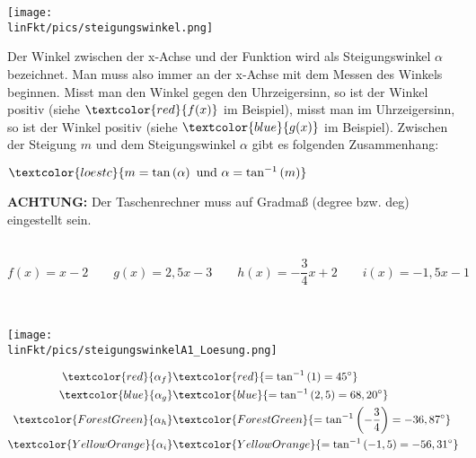 \begin{minipage}[t]{\textwidth}
	\centering
	\texttt{[image: \\linFkt/pics/steigungswinkel.png]}
\end{minipage}
Der Winkel zwischen der x-Achse und der Funktion wird als Steigungswinkel $\alpha$ bezeichnet. Man muss also immer an der x-Achse mit dem Messen des Winkels beginnen. Misst man den Winkel gegen den Uhrzeigersinn, so ist der Winkel positiv (siehe $\textcolor{red}{f(x)}$ im Beispiel), misst man im Uhrzeigersinn, so ist der Winkel positiv (siehe $\textcolor{blue}{g(x)}$ im Beispiel). Zwischen der Steigung $m$ und dem Steigungswinkel $\alpha$ gibt es folgenden Zusammenhang:\\
\begin{tcolorbox}
	\centering
	$\textcolor{loestc}{m=\tan\left(\alpha\right)\text{ und }\alpha=\tan^{-1}\left(m\right)}$
\end{tcolorbox}
\textbf{ACHTUNG:} Der Taschenrechner muss auf Gradmaß (degree bzw. deg) eingestellt sein.
\begin{Exercise}[title={Zeichne das Schaubild, miss den Steigungswinkel und vergleiche den Wert mit dem rechnerisch exakten.}, label=steigungswinkelA1]\\
	$f(x)=x-2 \qquad g(x)=2,5x-3 \qquad h(x)=-\dfrac{3}{4}x+2 \qquad i(x)=-1,5x-1$
\end{Exercise}
\newpage
\begin{Answer}[ref=steigungswinkelA1]\\
	\begin{minipage}{0.5\textwidth}
		\texttt{[image: \\linFkt/pics/steigungswinkelA1\_Loesung.png]}
	\end{minipage}
	\begin{minipage}{0.5\textwidth}
		\begin{align*}
			\textcolor{red}{\alpha_f}&\textcolor{red}{=\tan^{-1}\left(1\right)=45^\circ}\\
			\textcolor{blue}{\alpha_g}&\textcolor{blue}{=\tan^{-1}\left(2,5\right)=68,20^\circ}\\
			\textcolor{ForestGreen}{\alpha_h}&\textcolor{ForestGreen}{=\tan^{-1}\left(-\dfrac{3}{4}\right)=-36,87^\circ}\\
			\textcolor{YellowOrange}{\alpha_i}&\textcolor{YellowOrange}{=\tan^{-1}\left(-1,5\right)=-56,31^\circ}
		\end{align*}
	\end{minipage}

\end{Answer}

